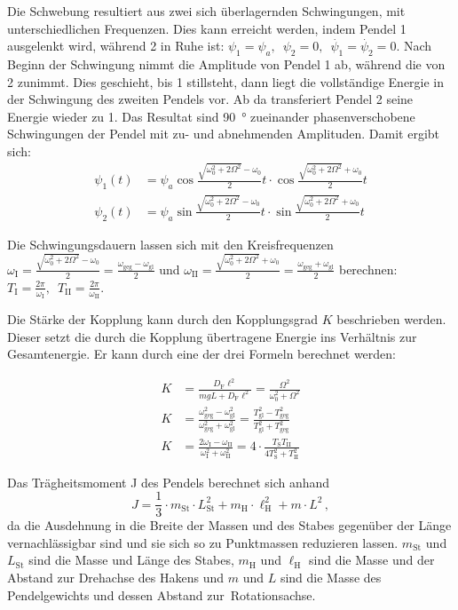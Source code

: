 \documentclass[
12pt,
a4paper,
bibliography=totocnumbered, %
BCOR=1cm, %
oneside, %
]{scrartcl}
\newcommand{\lh}{\ell_{\mathrm{H}}}
\begin{document}
Die Schwebung resultiert aus zwei sich überlagernden Schwingungen, mit unterschiedlichen Frequenzen. Dies kann erreicht werden, indem Pendel 1 ausgelenkt wird, während 2 in Ruhe ist: \(\psi_1 = \psi_a, \enspace \psi_2 = 0, \enspace \dot{\psi_1} = \dot{\psi_2} = 0\). Nach Beginn der Schwingung nimmt die Amplitude von Pendel 1 ab, während die von 2 zunimmt. Dies geschieht, bis 1 stillsteht, dann liegt die vollständige Energie in der Schwingung des zweiten Pendels vor. Ab da transferiert Pendel 2 seine Energie wieder zu 1. Das Resultat sind \qty{90}{\degree} zueinander phasenverschobene Schwingungen der Pendel mit zu- und abnehmenden Amplituden. Damit ergibt sich:
\begin{align}
	\psi_1(t) &= \psi_a\cos\frac{\sqrt{\omega_0^2+2\Omega^2}-\omega_0}{2}t\cdot\cos\frac{\sqrt{\omega_0^2+2\Omega^2}+\omega_0}{2}t\\
	\psi_2(t) &= \psi_a\sin\frac{\sqrt{\omega_0^2+2\Omega^2}-\omega_0}{2}t\cdot\sin\frac{\sqrt{\omega_0^2+2\Omega^2}+\omega_0}{2}t
\end{align}

Die Schwingungsdauern lassen sich mit den Kreisfrequenzen \(\omega_{\text{I}} = \frac{\sqrt{\omega_0^2 + 2\Omega^2} - \omega_0}{2} = \frac{\omega_{\text{geg}} - \omega_{\text{gl}}}{2}\) und \(\omega_{\text{II}} = \frac{\sqrt{\omega_0^2 + 2\Omega^2} + \omega_0}{2} = \frac{\omega_{\text{geg}} + \omega_{\text{gl}}}{2}\) berechnen: \(T_{\text{I}}=\frac{2\pi}{\omega_{\text{I}}}, \enspace T_{\text{II}} = \frac{2\pi}{\omega_{\text{II}}} \label{eq:t2}\).

Die Stärke der Kopplung kann durch den Kopplungsgrad \(K\) beschrieben werden. Dieser setzt die durch die Kopplung übertragene Energie ins Verhältnis zur Gesamtenergie. Er kann durch eine der drei Formeln berechnet werden:

\begin{align}
	K &= \frac{D_{\text{F}} \ell^2}{mgL + D_{\text{F}} \ell^2} = \frac{\Omega^2}{\omega_0^2 + \Omega^2}\label{eq:1}\\
	K &= \frac{\omega_{\text{geg}}^2 - \omega_{\text{gl}}^2}{\omega_{\text{geg}}^2 + \omega_{\text{gl}}^2} = \frac{T_{\text{gl}}^2 - T_{\text{geg}}^2}{T_{\text{gl}}^2 + T_{\text{geg}}^2}\label{eq:2}\\
	K &= \frac{2\omega_{\text{I}} - \omega_{\text{II}}}{\omega_{\text{I}}^2 + \omega_{\text{II}}^2} = 4\cdot\frac{T_{\text{S}} T_{\text{II}}}{4T_{\text{S}}^2 + T_{\text{II}}^2} \label{eq:3}
\end{align}

Das Trägheitsmoment J des Pendels berechnet sich anhand
\begin{equation}\label{eq:trägheitsmom}
	J=\frac{1}{3} \cdot m_{\text{St}} \cdot L_{\text{St}}^2 + m_{\text{H}} \cdot \lh^2 + m \cdot L^2 \,,
\end{equation}
da die Ausdehnung in die Breite der Massen und des Stabes gegenüber der Länge vernachlässigbar sind und sie sich so zu Punktmassen reduzieren lassen. \(m_{\text{St}}\) und \(L_{\text{St}}\) sind die Masse und Länge des Stabes, \(m_{\text{H}}\) und \(\lh\) sind die Masse und der Abstand zur Drehachse des Hakens und \(m\) und \(L\) sind die Masse des Pendelgewichts und dessen Abstand zur Rotationsachse.
\end{document}
